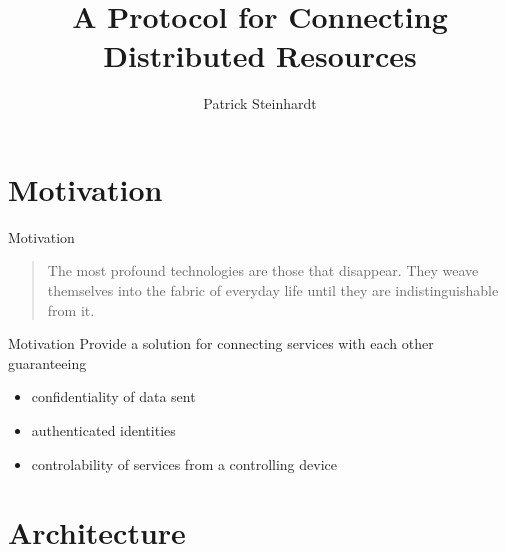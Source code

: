 \documentclass[a4paper]{beamer}
\author{Patrick Steinhardt}
\title{A Protocol for Connecting Distributed Resources}
\institute{Freie Universität Berlin}
\begin{document}
\begin{frame}[plain]
    \maketitle
\end{frame}

\begin{frame}
    \tableofcontents
\end{frame}

\section{Motivation}

\begin{frame}{Motivation}
    \begin{quote}
        The most profound technologies are those that disappear.
        They weave themselves into the fabric of everyday life until they are indistinguishable from it. \cite{weiser1991computer}
    \end{quote}
\end{frame}

\begin{frame}{Motivation}
    Provide a solution for connecting services with each other guaranteeing
    \begin{itemize}
        \item confidentiality of data sent
        \item authenticated identities
        \item controlability of services from a controlling device
    \end{itemize}
\end{frame}

\section{Architecture}
\end{document}
